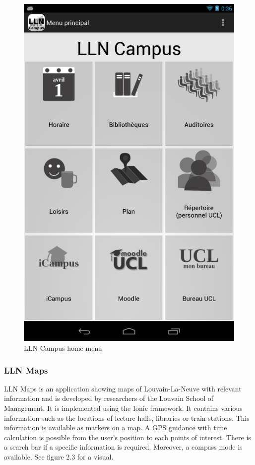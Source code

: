\documentclass{eplmastersthesis}
\begin{document}
\begin{figure}[H]
\centering
\includegraphics[scale = 0.2]{Images/llncampus.png}
\caption{LLN Campus home menu}
\end{figure}

\newpage

\subsubsection{LLN Maps}
LLN Maps is an application showing maps of Louvain-La-Neuve with relevant information and is developed by researchers of the Louvain School of Management. It is implemented using the Ionic framework. It contains various information such as the locations of lecture halls, libraries or train stations. This information is available as markers on a map. A GPS guidance with time calculation is possible from the user's position to each points of interest. There is a search bar if a specific information is required. Moreover, a compass mode is available. See figure 2.3 for a visual.
\end{document}
